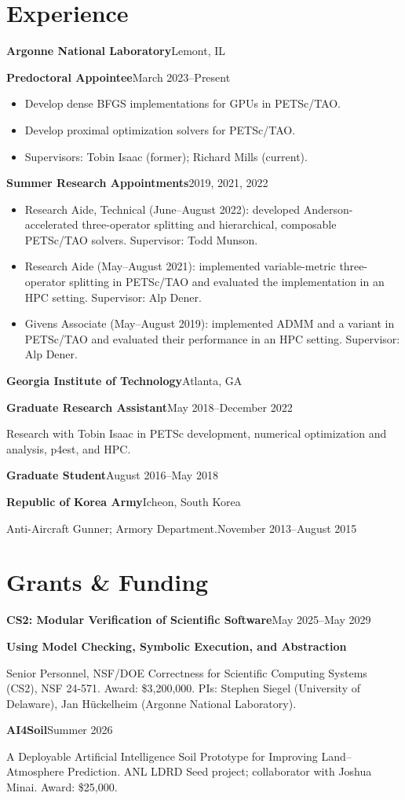 \documentclass[10pt,letterpaper]{article}
\newcommand{\entry}[2]{\par\textbf{#1}\hfill #2\par}
\begin{document}
\section{Experience}
\entry{Argonne National Laboratory}{Lemont, IL}
\entry{Predoctoral Appointee}{March 2023--Present}
\begin{itemize}
\item Develop dense BFGS implementations for GPUs in PETSc/TAO.
\item Develop proximal optimization solvers for PETSc/TAO.
\item Supervisors: Tobin Isaac (former); Richard Mills (current).
\end{itemize}
\entry{Summer Research Appointments}{2019, 2021, 2022}
\begin{itemize}
\item Research Aide, Technical (June--August 2022): developed Anderson-accelerated three-operator splitting and hierarchical, composable PETSc/TAO solvers. Supervisor: Todd Munson.
\item Research Aide (May--August 2021): implemented variable-metric three-operator splitting in PETSc/TAO and evaluated the implementation in an HPC setting. Supervisor: Alp Dener.
\item Givens Associate (May--August 2019): implemented ADMM and a variant in PETSc/TAO and evaluated their performance in an HPC setting. Supervisor: Alp Dener.
\end{itemize}
\entry{Georgia Institute of Technology}{Atlanta, GA}
\entry{Graduate Research Assistant}{May 2018--December 2022}
Research with Tobin Isaac in PETSc development, numerical optimization and analysis, p4est, and HPC.
\entry{Graduate Student}{August 2016--May 2018}
\entry{Republic of Korea Army}{Icheon, South Korea}
Anti-Aircraft Gunner; Armory Department.\hfill November 2013--August 2015

\section{Grants \& Funding}
\entry{CS2: Modular Verification of Scientific Software}{May 2025--May 2029}
\textbf{Using Model Checking, Symbolic Execution, and Abstraction}\par
Senior Personnel, NSF/DOE Correctness for Scientific Computing Systems (CS2), NSF 24-571.
Award: \$3,200,000. PIs: Stephen Siegel (University of Delaware), Jan H\"uckelheim (Argonne National Laboratory).
\entry{AI4Soil}{Summer 2026}
A Deployable Artificial Intelligence Soil Prototype for Improving Land--Atmosphere Prediction.
ANL LDRD Seed project; collaborator with Joshua Minai. Award: \$25,000.
\end{document}
